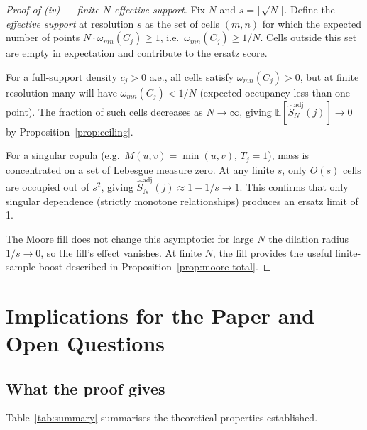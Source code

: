 \documentclass[11pt,a4paper]{article}
\theoremstyle{definition}
\newcommand{\E}{\mathbb{E}}
\begin{document}
\begin{proof}[Proof of (iv) — finite-$N$ effective support]
Fix $N$ and $s = \lceil\sqrt{N}\rceil$.  Define the \emph{effective
support} at resolution $s$ as the set of cells $(m,n)$ for which the
expected number of points $N \cdot \omega_{mn}(C_j) \ge 1$, i.e.\
$\omega_{mn}(C_j) \ge 1/N$.  Cells outside this set are empty in
expectation and contribute to the ersatz score.

For a full-support density $c_j > 0$ a.e., all cells satisfy
$\omega_{mn}(C_j) > 0$, but at finite resolution many will have
$\omega_{mn}(C_j) < 1/N$ (expected occupancy less than one point).  The
fraction of such cells decreases as $N \to \infty$, giving
$\E[\hat{S}^{\mathrm{adj}}_N(j)] \to 0$ by Proposition~\ref{prop:ceiling}.

For a singular copula (e.g.\ $M(u,v) = \min(u,v)$, $T_j = 1$), mass is
concentrated on a set of Lebesgue measure zero.  At any finite $s$, only
$O(s)$ cells are occupied out of $s^2$, giving $\hat{S}^{\mathrm{adj}}_N(j)
\approx 1 - 1/s \to 1$.  This confirms that only singular dependence
(strictly monotone relationships) produces an ersatz limit of 1.

The Moore fill does not change this asymptotic: for large $N$ the dilation
radius $1/s \to 0$, so the fill's effect vanishes.  At finite $N$, the
fill provides the useful finite-sample boost described in
Proposition~\ref{prop:moore-total}.
\end{proof}

\section{Implications for the Paper and Open Questions}

\subsection{What the proof gives}

Table~\ref{tab:summary} summarises the theoretical properties established.
\end{document}
